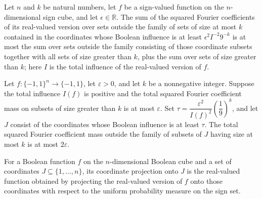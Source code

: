 \begin{theorem}
\label{FABL.fourierWeightOutside_theorem9_28SmallFamily_le_add}
\leanok
{}
Let $n$ and $k$ be natural numbers, let $f$ be a sign-valued function on the
$n$-dimensional sign cube, and let $\epsilon\in\mathbb{R}$. The sum of the squared
Fourier coefficients of its real-valued version over sets outside the family of sets of
size at most $k$ contained in the coordinates whose Boolean influence is at least
$\epsilon^2 I^{-2}9^{-k}$ is at most the sum over sets outside the family consisting of
those coordinate subsets together with all sets of size greater than $k$, plus the sum
over sets of size greater than $k$; here $I$ is the total influence of the real-valued
version of $f$.
\end{theorem}

\begin{theorem}
\label{FABL.theorem9_28_small_spectrum_concentrated}
\leanok
{}
Let $f:\{-1,1\}^n\to\{-1,1\}$, let $\varepsilon>0$, and let $k$ be a nonnegative
integer. Suppose the total influence $I(f)$ is positive and the total squared Fourier
coefficient mass on subsets of size greater than $k$ is at most $\varepsilon$. Set
$\tau=\dfrac{\varepsilon^2}{I(f)^2}\left(\dfrac{1}{9}\right)^k$, and let $J$ consist of
the coordinates whose Boolean influence is at least $\tau$. The total squared Fourier
coefficient mass outside the family of subsets of $J$ having size at most $k$ is at most
$2\varepsilon$.
\end{theorem}

\begin{definition}
\label{FABL.booleanCoordinateProjection}
\leanok
{}
For a Boolean function $f$ on the $n$-dimensional Boolean cube and a set of coordinates
$J\subseteq\{1,\ldots,n\}$, its coordinate projection onto $J$ is the real-valued
function obtained by projecting the real-valued version of $f$ onto those coordinates
with respect to the uniform probability measure on the sign set.
\end{definition}

